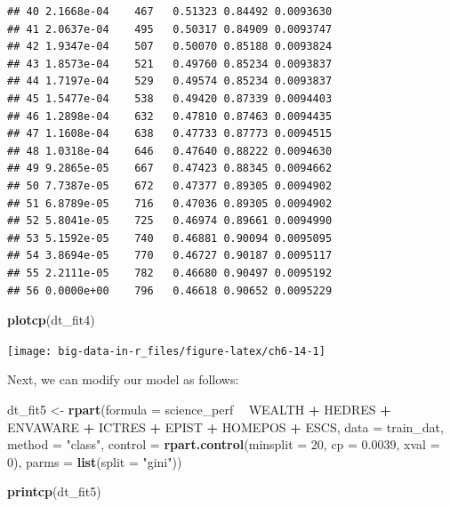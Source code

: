 \documentclass[]{book}
\newenvironment{Shaded}{\begin{snugshade}}{\end{snugshade}}
\newcommand{\DataTypeTok}[1]{\textcolor[rgb]{0.13,0.29,0.53}{#1}}
\newcommand{\DecValTok}[1]{\textcolor[rgb]{0.00,0.00,0.81}{#1}}
\newcommand{\FloatTok}[1]{\textcolor[rgb]{0.00,0.00,0.81}{#1}}
\newcommand{\KeywordTok}[1]{\textcolor[rgb]{0.13,0.29,0.53}{\textbf{#1}}}
\newcommand{\NormalTok}[1]{#1}
\newcommand{\OperatorTok}[1]{\textcolor[rgb]{0.81,0.36,0.00}{\textbf{#1}}}
\newcommand{\StringTok}[1]{\textcolor[rgb]{0.31,0.60,0.02}{#1}}
\begin{document}
\begin{verbatim}
## 40 2.1668e-04    467   0.51323 0.84492 0.0093630
## 41 2.0637e-04    495   0.50317 0.84909 0.0093747
## 42 1.9347e-04    507   0.50070 0.85188 0.0093824
## 43 1.8573e-04    521   0.49760 0.85234 0.0093837
## 44 1.7197e-04    529   0.49574 0.85234 0.0093837
## 45 1.5477e-04    538   0.49420 0.87339 0.0094403
## 46 1.2898e-04    632   0.47810 0.87463 0.0094435
## 47 1.1608e-04    638   0.47733 0.87773 0.0094515
## 48 1.0318e-04    646   0.47640 0.88222 0.0094630
## 49 9.2865e-05    667   0.47423 0.88345 0.0094662
## 50 7.7387e-05    672   0.47377 0.89305 0.0094902
## 51 6.8789e-05    716   0.47036 0.89305 0.0094902
## 52 5.8041e-05    725   0.46974 0.89661 0.0094990
## 53 5.1592e-05    740   0.46881 0.90094 0.0095095
## 54 3.8694e-05    770   0.46727 0.90187 0.0095117
## 55 2.2111e-05    782   0.46680 0.90497 0.0095192
## 56 0.0000e+00    796   0.46618 0.90652 0.0095229
\end{verbatim}

\begin{Shaded}
\begin{Highlighting}[]
\KeywordTok{plotcp}\NormalTok{(dt_fit4)}
\end{Highlighting}
\end{Shaded}

\texttt{[image: big-data-in-r\_files/figure-latex/ch6-14-1]}

Next, we can modify our model as follows:

\begin{Shaded}
\begin{Highlighting}[]
\NormalTok{dt_fit5 <-}\StringTok{ }\KeywordTok{rpart}\NormalTok{(}\DataTypeTok{formula =}\NormalTok{ science_perf }\OperatorTok{~}\StringTok{ }\NormalTok{WEALTH }\OperatorTok{+}\StringTok{ }\NormalTok{HEDRES }\OperatorTok{+}\StringTok{ }\NormalTok{ENVAWARE }\OperatorTok{+}\StringTok{ }\NormalTok{ICTRES }\OperatorTok{+}\StringTok{ }
\StringTok{                   }\NormalTok{EPIST }\OperatorTok{+}\StringTok{ }\NormalTok{HOMEPOS }\OperatorTok{+}\StringTok{ }\NormalTok{ESCS,}
                 \DataTypeTok{data =}\NormalTok{ train_dat,}
                 \DataTypeTok{method =} \StringTok{"class"}\NormalTok{, }
                 \DataTypeTok{control =} \KeywordTok{rpart.control}\NormalTok{(}\DataTypeTok{minsplit =} \DecValTok{20}\NormalTok{, }
                                         \DataTypeTok{cp =} \FloatTok{0.0039}\NormalTok{,}
                                         \DataTypeTok{xval =} \DecValTok{0}\NormalTok{),}
                \DataTypeTok{parms =} \KeywordTok{list}\NormalTok{(}\DataTypeTok{split =} \StringTok{"gini"}\NormalTok{))}

\KeywordTok{printcp}\NormalTok{(dt_fit5)}
\end{Highlighting}
\end{Shaded}
\end{document}
